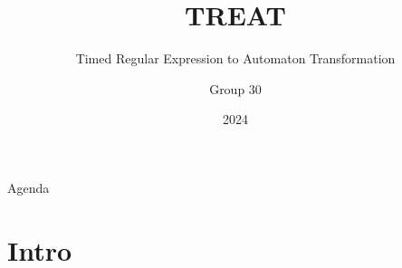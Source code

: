 \documentclass{beamer}
\title{TREAT}
\subtitle{Timed Regular Expression to Automaton Transformation}
\author{Group 30}
\institute{Aalborg Universitet}
\date{2024}
\newcommand{\name}{}
\begin{document}
\frame{\titlepage}

\begin{frame}{Agenda}
    \tableofcontents
\end{frame}

\section{Intro} %
% 

\renewcommand{\name}{Frederik}


% 
\end{document}
